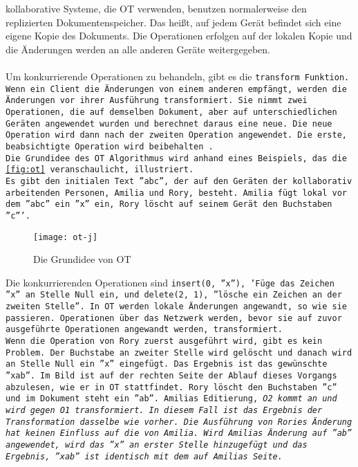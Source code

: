 %
\Gls{kollaborativ}e Systeme, die \gls{OT} verwenden, benutzen normalerweise den replizierten Dokumentenspeicher.
Das heißt, auf jedem Gerät befindet sich eine eigene Kopie des Dokuments.
Die Operationen erfolgen auf der lokalen Kopie und die Änderungen werden an alle anderen Geräte weitergegeben.\\\\
%
Um konkurrierende Operationen zu behandeln, gibt es die \tt{transform} Funktion.
Wenn ein Client die Änderungen von einem anderen empfängt, werden die Änderungen vor ihrer Ausführung transformiert.
Sie nimmt zwei Operationen, die auf demselben Dokument, aber auf unterschiedlichen Geräten angewendet wurden und berechnet daraus eine neue.
Die neue Operation wird dann nach der zweiten Operation angewendet. Die erste, beabsichtigte Operation wird beibehalten~\cite{ot_paper}.\\
%
Die Grundidee des \gls{OT} Algorithmus wird anhand eines Beispiels, das die \autoref{fig:ot} veranschaulicht, illustriert.\\
Es gibt den initialen Text ''abc'', der auf den Geräten der kollaborativ arbeitenden Personen, Amilia und Rory, besteht.
Amilia fügt lokal vor dem ''abc'' ein ''x'' ein, Rory löscht auf seinem Gerät den Buchstaben ''c'''.
%
\begin{figure}[h]
  \centering
  \texttt{[image: ot-j]}
  \grayRule
  \caption{Die Grundidee von \gls{OT}}
  \label{fig:ot}
\end{figure}
%
Die konkurrierenden Operationen sind \tt{insert(0, ''x'')}, 'Füge das Zeichen ''x'' an Stelle Null ein, und \tt{delete(2, 1)}, ''lösche ein Zeichen an der zweiten Stelle''.
In \gls{OT} werden lokale Änderungen angewandt, so wie sie passieren.
Operationen über das Netzwerk werden, bevor sie auf zuvor ausgeführte Operationen angewandt werden, transformiert.\\
%
Wenn die Operation von Rory zuerst ausgeführt wird, gibt es kein Problem. Der Buchstabe an zweiter Stelle wird gelöscht und danach wird an Stelle Null ein ''x'' eingefügt. Das Ergebnis ist das gewünschte ''xab''.
Im Bild ist auf der rechten Seite der Ablauf dieses Vorgangs abzulesen, wie er in \gls{OT} stattfindet.
Rory löscht den Buchstaben ''c'' und im Dokument steht ein ''ab''.
Amilias Editierung, \it{O2} kommt an und wird gegen \it{O1} transformiert. In diesem Fall ist das Ergebnis der Transformation dasselbe wie vorher.
Die Ausführung von Rories Änderung hat keinen Einfluss auf die von Amilia.
Wird Amilias Änderung auf ''ab'' angewendet, wird das ''x'' an erster Stelle hinzugefügt und das Ergebnis, ''xab'' ist identisch mit dem auf Amilias Seite.\\
